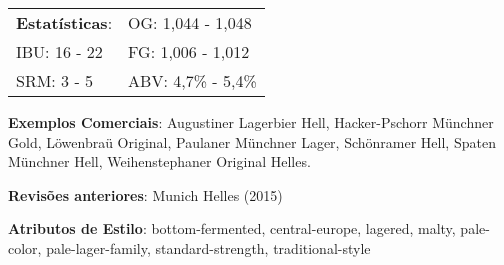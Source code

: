 \begin{tabular}{@{}p{35mm}p{35mm}@{}}
  \textbf{Estatísticas}: & OG: 1,044 - 1,048 \\
  IBU: 16 - 22  & FG: 1,006 - 1,012  \\
  SRM: 3 - 5   & ABV: 4,7\% - 5,4\%
\end{tabular}

\textbf{Exemplos Comerciais}: Augustiner Lagerbier Hell, Hacker-Pschorr Münchner Gold, Löwenbraü Original, Paulaner Münchner Lager, Schönramer Hell, Spaten Münchner Hell, Weihenstephaner Original Helles.

\textbf{Revisões anteriores}: Munich Helles (2015)

\textbf{Atributos de Estilo}: bottom-fermented, central-europe, lagered, malty, pale-color, pale-lager-family, standard-strength, traditional-style
